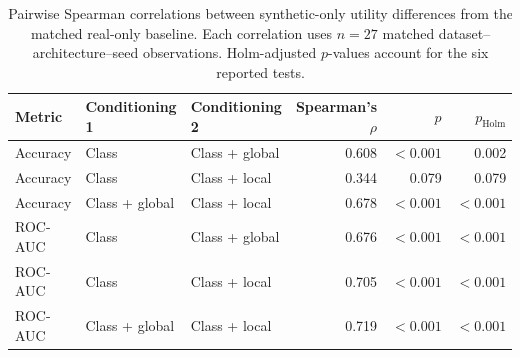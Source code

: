 \begin{table}[htbp]
\centering
\begin{tabular}{lllrrr}
\toprule
Metric & Conditioning 1 & Conditioning 2 & Spearman's $\rho$ & $p$ & $p_{\mathrm{Holm}}$ \\
\midrule
Accuracy & Class & Class + global & 0.608 & $<0.001$ & 0.002 \\
Accuracy & Class & Class + local & 0.344 & 0.079 & 0.079 \\
Accuracy & Class + global & Class + local & 0.678 & $<0.001$ & $<0.001$ \\
\midrule
ROC-AUC & Class & Class + global & 0.676 & $<0.001$ & $<0.001$ \\
ROC-AUC & Class & Class + local & 0.705 & $<0.001$ & $<0.001$ \\
ROC-AUC & Class + global & Class + local & 0.719 & $<0.001$ & $<0.001$ \\
\bottomrule
\end{tabular}
\caption{Pairwise Spearman correlations between synthetic-only utility differences from the matched real-only baseline. Each correlation uses $n=27$ matched dataset--architecture--seed observations. Holm-adjusted $p$-values account for the six reported tests.}
\label{tab:replacement-conditioning-correlations}
\end{table}
